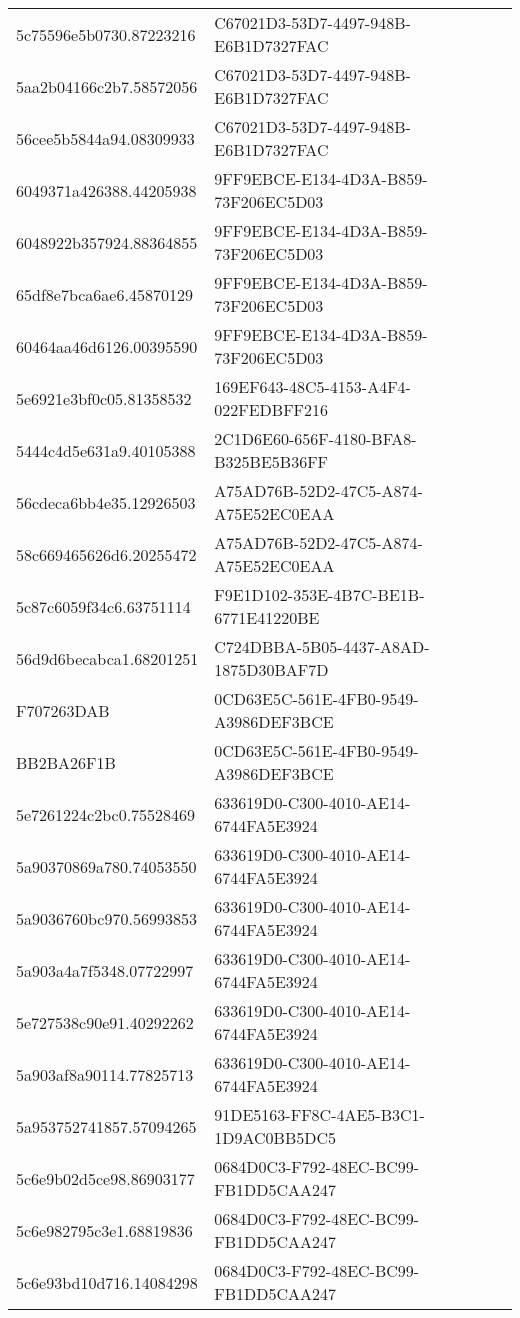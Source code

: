 \begin{tabular}{ll}
5c75596e5b0730.87223216 & C67021D3-53D7-4497-948B-E6B1D7327FAC \\
5aa2b04166c2b7.58572056 & C67021D3-53D7-4497-948B-E6B1D7327FAC \\
56cee5b5844a94.08309933 & C67021D3-53D7-4497-948B-E6B1D7327FAC \\
6049371a426388.44205938 & 9FF9EBCE-E134-4D3A-B859-73F206EC5D03 \\
6048922b357924.88364855 & 9FF9EBCE-E134-4D3A-B859-73F206EC5D03 \\
65df8e7bca6ae6.45870129 & 9FF9EBCE-E134-4D3A-B859-73F206EC5D03 \\
60464aa46d6126.00395590 & 9FF9EBCE-E134-4D3A-B859-73F206EC5D03 \\
5e6921e3bf0c05.81358532 & 169EF643-48C5-4153-A4F4-022FEDBFF216 \\
5444c4d5e631a9.40105388 & 2C1D6E60-656F-4180-BFA8-B325BE5B36FF \\
56cdeca6bb4e35.12926503 & A75AD76B-52D2-47C5-A874-A75E52EC0EAA \\
58c669465626d6.20255472 & A75AD76B-52D2-47C5-A874-A75E52EC0EAA \\
5c87c6059f34c6.63751114 & F9E1D102-353E-4B7C-BE1B-6771E41220BE \\
56d9d6becabca1.68201251 & C724DBBA-5B05-4437-A8AD-1875D30BAF7D \\
F707263DAB & 0CD63E5C-561E-4FB0-9549-A3986DEF3BCE \\
BB2BA26F1B & 0CD63E5C-561E-4FB0-9549-A3986DEF3BCE \\
5e7261224c2bc0.75528469 & 633619D0-C300-4010-AE14-6744FA5E3924 \\
5a90370869a780.74053550 & 633619D0-C300-4010-AE14-6744FA5E3924 \\
5a9036760bc970.56993853 & 633619D0-C300-4010-AE14-6744FA5E3924 \\
5a903a4a7f5348.07722997 & 633619D0-C300-4010-AE14-6744FA5E3924 \\
5e727538c90e91.40292262 & 633619D0-C300-4010-AE14-6744FA5E3924 \\
5a903af8a90114.77825713 & 633619D0-C300-4010-AE14-6744FA5E3924 \\
5a953752741857.57094265 & 91DE5163-FF8C-4AE5-B3C1-1D9AC0BB5DC5 \\
5c6e9b02d5ce98.86903177 & 0684D0C3-F792-48EC-BC99-FB1DD5CAA247 \\
5c6e982795c3e1.68819836 & 0684D0C3-F792-48EC-BC99-FB1DD5CAA247 \\
5c6e93bd10d716.14084298 & 0684D0C3-F792-48EC-BC99-FB1DD5CAA247 \\

\end{tabular}
